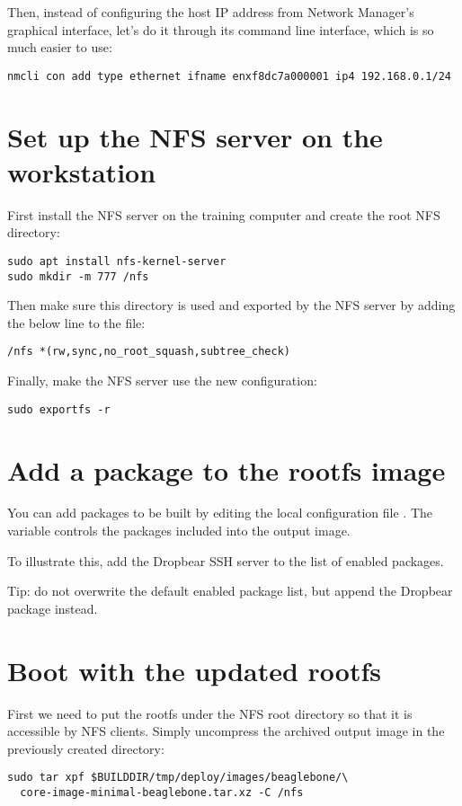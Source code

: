 Then, instead of configuring the host IP address from Network
Manager's graphical interface, let's do it through its command line
interface, which is so much easier to use:

\begin{verbatim}
nmcli con add type ethernet ifname enxf8dc7a000001 ip4 192.168.0.1/24
\end{verbatim}

\section{Set up the NFS server on the workstation}

First install the NFS server on the training computer and create the root NFS
directory:
\begin{verbatim}
sudo apt install nfs-kernel-server
sudo mkdir -m 777 /nfs
\end{verbatim}

Then make sure this directory is used and exported by the NFS server by adding
the below line to the  file:

\begin{verbatim}
/nfs *(rw,sync,no_root_squash,subtree_check)
\end{verbatim}

Finally, make the NFS server use the new configuration:
\begin{verbatim}
sudo exportfs -r
\end{verbatim}

\section{Add a package to the rootfs image}

You can add packages to be built by editing the local configuration file
. The  variable controls the
packages included into the output image.

To illustrate this, add the Dropbear SSH server to the list of enabled
packages.

Tip: do not overwrite the default enabled package list, but append the Dropbear
package instead.

\section{Boot with the updated rootfs}

First we need to put the rootfs under the NFS root directory so that it is
accessible by NFS clients. Simply uncompress the archived output image in the
previously created  directory:
\begin{verbatim}
sudo tar xpf $BUILDDIR/tmp/deploy/images/beaglebone/\
  core-image-minimal-beaglebone.tar.xz -C /nfs
\end{verbatim}

